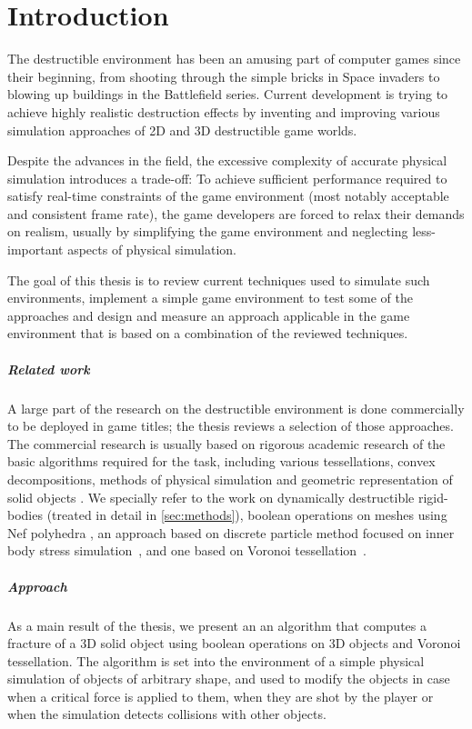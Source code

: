 \chapter*{Introduction}
The destructible environment has been an amusing part of computer games since their beginning, from shooting through the simple bricks in Space invaders to blowing up buildings in the Battlefield series. Current development is trying to achieve highly realistic destruction effects by inventing and improving various simulation approaches of 2D and 3D destructible game worlds.

Despite the advances in the field, the excessive complexity of accurate physical simulation introduces a trade-off: To achieve sufficient performance required to satisfy real-time constraints of the game environment (most notably acceptable and consistent frame rate), the game developers are forced to relax their demands on realism, usually by simplifying the game environment and neglecting less-important aspects of physical simulation.

The goal of this thesis is to review current techniques used to simulate such environments, implement a simple game environment to test some of the approaches and design and measure an approach applicable in the game environment that is based on a combination of the reviewed techniques.

\paragraph{Related work}
A large part of the research on the destructible environment is done commercially to be deployed in game titles; the thesis reviews a selection of those approaches. The commercial research is usually based on rigorous academic research of the basic algorithms required for the task, including various tessellations, convex decompositions, methods of physical simulation and geometric representation of solid objects . We specially refer to the work on dynamically destructible rigid-bodies (treated in detail in \cref{sec:methods}), boolean operations on meshes using Nef polyhedra \citet{nefpoly}, an approach based on discrete particle method focused on inner body stress simulation~\cite{edem}, and one based on Voronoi tessellation~\cite{nvidia}.

\paragraph{Approach}
As a main result of the thesis, we present an an algorithm that computes a fracture of a 3D solid object using boolean operations on 3D objects and Voronoi tessellation. The algorithm is set into the environment of a simple physical simulation of objects of arbitrary shape, and used to modify the objects in case when a critical force is applied to them, \ie when they are shot by the player or when the simulation detects collisions with other objects.

